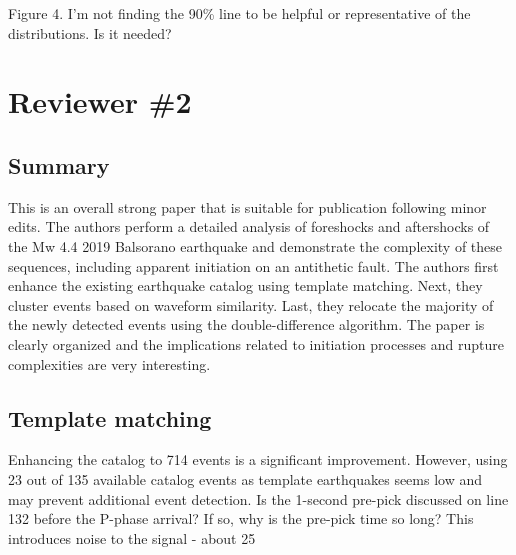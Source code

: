 \documentclass[10pt]{extarticle}
\begin{document}
\begin{Answer}
 \WorkInProgressRevTask
\end{Answer}
%
%


\begin{ReviewerComment}{1}
\noindent 
Figure 4. I'm not finding the 90\% line to be helpful or representative of the distributions. Is it needed?

\end{ReviewerComment}


\begin{Answer}
 \WorkInProgressRevTask
\end{Answer}
%
%

\section*{Reviewer \#2}


\subsection*{Summary}

This is an overall strong paper that is suitable for publication following minor edits. The authors perform a detailed analysis of foreshocks and aftershocks of the Mw 4.4 2019 Balsorano earthquake and demonstrate the complexity of these sequences, including apparent initiation on an antithetic fault. The authors first enhance the existing earthquake catalog using template matching. Next, they cluster events based on waveform similarity. Last, they relocate the majority of the newly detected events using the double-difference algorithm. The paper is clearly organized and the implications related to initiation processes and rupture complexities are very interesting.  \\


\subsection*{Template matching}

\begin{ReviewerComment}{1}
\noindent 
Enhancing the catalog to 714 events is a significant improvement. However, using 23 out of 135 available catalog events as template earthquakes seems low and may prevent additional event detection. Is the 1-second pre-pick discussed on line 132 before the P-phase arrival? If so, why is the pre-pick time so long? This introduces noise to the signal - about 25%

\end{ReviewerComment}
\end{document}
